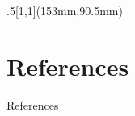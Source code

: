 \documentclass[xcolor=svgnames]{beamer}
\numberwithin{equation}{section}
\numberwithin{figure}{section}
\begin{document}
\section{}
\usebackgroundtemplate{}
\begin{frame}[plain]
	\titlepage
	
	\begin{textblock*}{.5\linewidth}[1,1](153mm,90.5mm)
		{\tiny
			\vskip5pt
			\vskip5pt
			
		}
	\end{textblock*}
	
	
	\addbuild
	
	\addtocounter{framenumber}{-1}
\end{frame}

\section{References}
\begin{frame}[t,allowframebreaks]{References}
	
	\tiny
	
\end{frame}
\end{document}
